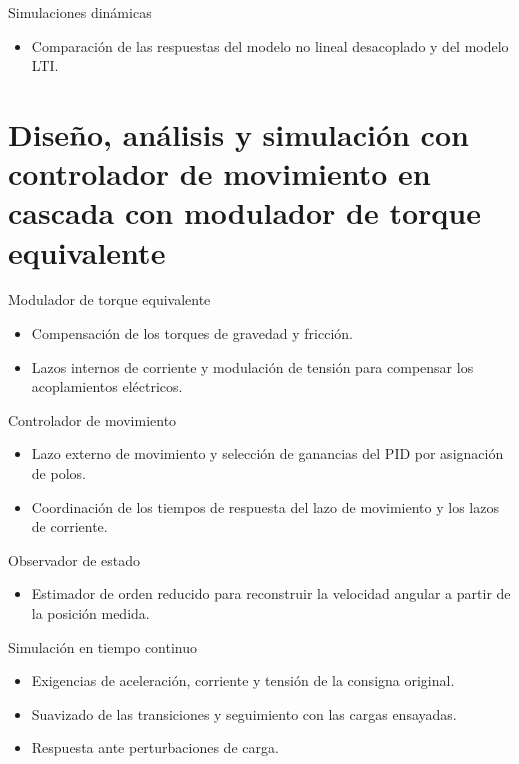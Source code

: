 \documentclass{beamer}
\begin{document}
\begin{frame}{Simulaciones dinámicas}
  \begin{itemize}
    \item Comparación de las respuestas del modelo no lineal desacoplado y del modelo LTI.
  \end{itemize}
\end{frame}

\section[Control de movimiento en cascada]{Diseño, análisis y simulación con controlador de movimiento en cascada con modulador de torque equivalente}

\begin{frame}{Modulador de torque equivalente}
  \begin{itemize}
    \item Compensación de los torques de gravedad y fricción.
    \item Lazos internos de corriente y modulación de tensión para compensar los acoplamientos eléctricos.
  \end{itemize}
\end{frame}

\begin{frame}{Controlador de movimiento}
  \begin{itemize}
    \item Lazo externo de movimiento y selección de ganancias del PID por asignación de polos.
    \item Coordinación de los tiempos de respuesta del lazo de movimiento y los lazos de corriente.
  \end{itemize}
\end{frame}

\begin{frame}{Observador de estado}
  \begin{itemize}
    \item Estimador de orden reducido para reconstruir la velocidad angular a partir de la posición medida.
  \end{itemize}
\end{frame}

\begin{frame}{Simulación en tiempo continuo}
  \begin{itemize}
    \item Exigencias de aceleración, corriente y tensión de la consigna original.
    \item Suavizado de las transiciones y seguimiento con las cargas ensayadas.
    \item Respuesta ante perturbaciones de carga.
  \end{itemize}
\end{frame}
\end{document}
